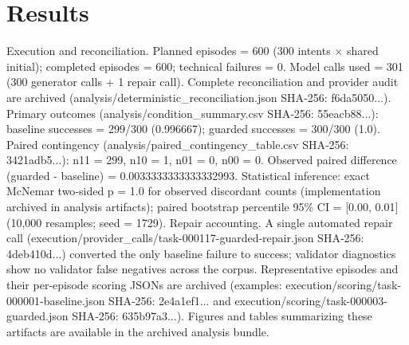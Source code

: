 \documentclass[conference]{IEEEtran}
\begin{document}
\section{Results}
Execution and reconciliation. Planned episodes = 600 (300 intents \ensuremath{\times} shared initial); completed episodes = 600; technical failures = 0. Model calls used = 301 (300 generator calls + 1 repair call). Complete reconciliation and provider audit are archived (analysis/deterministic\_reconciliation.json SHA‑256: f6da5050...). Primary outcomes (analysis/condition\_summary.csv SHA‑256: 55eacb88...): baseline successes = 299/300 (0.996667); guarded successes = 300/300 (1.0). Paired contingency (analysis/paired\_contingency\_table.csv SHA‑256: 3421adb5...): n11 = 299, n10 = 1, n01 = 0, n00 = 0. Observed paired difference (guarded - baseline) = 0.0033333333333332993. Statistical inference: exact McNemar two‑sided p = 1.0 for observed discordant counts (implementation archived in analysis artifacts); paired bootstrap percentile 95\% CI = [0.00, 0.01] (10,000 resamples; seed = 1729). Repair accounting. A single automated repair call (execution/provider\_calls/task-000117-guarded-repair.json SHA‑256: 4deb410d...) converted the only baseline failure to success; validator diagnostics show no validator false negatives across the corpus. Representative episodes and their per‑episode scoring JSONs are archived (examples: execution/scoring/task-000001-baseline.json SHA‑256: 2e4a1ef1... and execution/scoring/task-000003-guarded.json SHA‑256: 635b97a3...). Figures and tables summarizing these artifacts are available in the archived analysis bundle.
\end{document}
